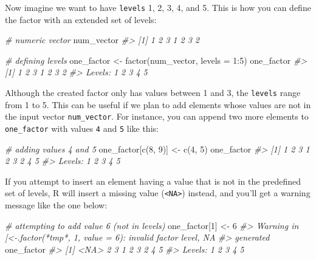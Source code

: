 \documentclass[
]{book}
\newenvironment{Shaded}{\begin{snugshade}}{\end{snugshade}}
\newcommand{\AttributeTok}[1]{\textcolor[rgb]{0.77,0.63,0.00}{#1}}
\newcommand{\CommentTok}[1]{\textcolor[rgb]{0.56,0.35,0.01}{\textit{#1}}}
\newcommand{\DecValTok}[1]{\textcolor[rgb]{0.00,0.00,0.81}{#1}}
\newcommand{\FunctionTok}[1]{\textcolor[rgb]{0.00,0.00,0.00}{#1}}
\newcommand{\NormalTok}[1]{#1}
\newcommand{\OtherTok}[1]{\textcolor[rgb]{0.56,0.35,0.01}{#1}}
\newcommand{\SpecialCharTok}[1]{\textcolor[rgb]{0.00,0.00,0.00}{#1}}
\begin{document}
Now imagine we want to have \texttt{levels} 1, 2, 3, 4, and 5. This is how you can
define the factor with an extended set of levels:

\begin{Shaded}
\begin{Highlighting}[]
\CommentTok{\# numeric vector}
\NormalTok{num\_vector}
\CommentTok{\#\textgreater{} [1] 1 2 3 1 2 3 2}

\CommentTok{\# defining levels}
\NormalTok{one\_factor }\OtherTok{\textless{}{-}} \FunctionTok{factor}\NormalTok{(num\_vector, }\AttributeTok{levels =} \DecValTok{1}\SpecialCharTok{:}\DecValTok{5}\NormalTok{)}
\NormalTok{one\_factor}
\CommentTok{\#\textgreater{} [1] 1 2 3 1 2 3 2}
\CommentTok{\#\textgreater{} Levels: 1 2 3 4 5}
\end{Highlighting}
\end{Shaded}

Although the created factor only has values between 1 and 3, the \texttt{levels} range
from 1 to 5. This can be useful if we plan to add elements whose values are not
in the input vector \texttt{num\_vector}. For instance, you can append two more elements
to \texttt{one\_factor} with values \texttt{4} and \texttt{5} like this:

\begin{Shaded}
\begin{Highlighting}[]
\CommentTok{\# adding values 4 and 5}
\NormalTok{one\_factor[}\FunctionTok{c}\NormalTok{(}\DecValTok{8}\NormalTok{, }\DecValTok{9}\NormalTok{)] }\OtherTok{\textless{}{-}} \FunctionTok{c}\NormalTok{(}\DecValTok{4}\NormalTok{, }\DecValTok{5}\NormalTok{)}
\NormalTok{one\_factor}
\CommentTok{\#\textgreater{} [1] 1 2 3 1 2 3 2 4 5}
\CommentTok{\#\textgreater{} Levels: 1 2 3 4 5}
\end{Highlighting}
\end{Shaded}

If you attempt to insert an element having a value that is not in the
predefined set of levels, R will insert a missing value (\texttt{\textless{}NA\textgreater{}}) instead, and
you'll get a warning message like the one below:

\begin{Shaded}
\begin{Highlighting}[]
\CommentTok{\# attempting to add value 6 (not in levels)}
\NormalTok{one\_factor[}\DecValTok{1}\NormalTok{] }\OtherTok{\textless{}{-}} \DecValTok{6}
\CommentTok{\#\textgreater{} Warning in \textasciigrave{}[\textless{}{-}.factor\textasciigrave{}(\textasciigrave{}*tmp*\textasciigrave{}, 1, value = 6): invalid factor level, NA}
\CommentTok{\#\textgreater{} generated}
\NormalTok{one\_factor}
\CommentTok{\#\textgreater{} [1] \textless{}NA\textgreater{} 2    3    1    2    3    2    4    5   }
\CommentTok{\#\textgreater{} Levels: 1 2 3 4 5}
\end{Highlighting}
\end{Shaded}
\end{document}
